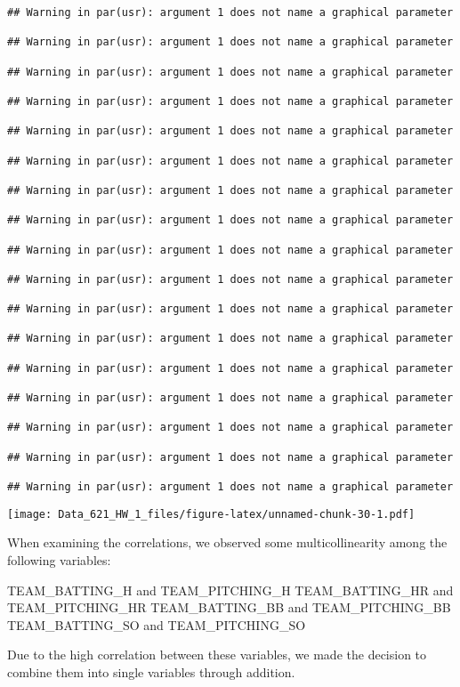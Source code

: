 \documentclass[
]{article}
\begin{document}
\begin{verbatim}
## Warning in par(usr): argument 1 does not name a graphical parameter

## Warning in par(usr): argument 1 does not name a graphical parameter

## Warning in par(usr): argument 1 does not name a graphical parameter

## Warning in par(usr): argument 1 does not name a graphical parameter

## Warning in par(usr): argument 1 does not name a graphical parameter

## Warning in par(usr): argument 1 does not name a graphical parameter

## Warning in par(usr): argument 1 does not name a graphical parameter

## Warning in par(usr): argument 1 does not name a graphical parameter

## Warning in par(usr): argument 1 does not name a graphical parameter

## Warning in par(usr): argument 1 does not name a graphical parameter

## Warning in par(usr): argument 1 does not name a graphical parameter

## Warning in par(usr): argument 1 does not name a graphical parameter

## Warning in par(usr): argument 1 does not name a graphical parameter

## Warning in par(usr): argument 1 does not name a graphical parameter

## Warning in par(usr): argument 1 does not name a graphical parameter

## Warning in par(usr): argument 1 does not name a graphical parameter

## Warning in par(usr): argument 1 does not name a graphical parameter
\end{verbatim}

\texttt{[image: Data\_621\_HW\_1\_files/figure-latex/unnamed-chunk-30-1.pdf]}

When examining the correlations, we observed some multicollinearity
among the following variables:

TEAM\_BATTING\_H and TEAM\_PITCHING\_H TEAM\_BATTING\_HR and
TEAM\_PITCHING\_HR TEAM\_BATTING\_BB and TEAM\_PITCHING\_BB
TEAM\_BATTING\_SO and TEAM\_PITCHING\_SO

Due to the high correlation between these variables, we made the
decision to combine them into single variables through addition.
\end{document}
